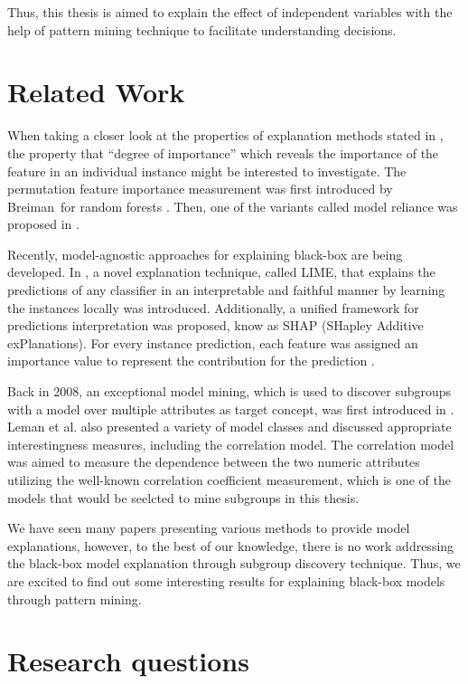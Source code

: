 \documentclass[runningheads]{llncs}
\begin{document}
	Thus, this thesis is aimed to explain the effect of independent variables with the help of pattern mining technique to facilitate understanding decisions.
	
	
	\section{Related Work}
	
	When taking a closer look at the properties of explanation methods stated in \cite{robnik2018perturbation}, the property that “degree of importance” which reveals the importance of the feature in an individual instance might be interested to investigate. The permutation feature importance measurement was first introduced by Breiman for random forests \cite{breiman2001random}. Then, one of the variants called model reliance was proposed in \cite{fisher2018model}. 
	
	Recently, model-agnostic approaches for explaining black-box are being developed. In \cite{ribeiro2016should}, a novel explanation technique, called LIME,  that explains the predictions of any classifier in an interpretable and faithful manner by learning the instances locally was introduced. Additionally, a unified framework for predictions interpretation was proposed, know as SHAP (SHapley Additive exPlanations). For every instance prediction, each feature was assigned an importance value to represent the contribution for the prediction \cite{lundberg2017unified}.
	
	Back in 2008, an exceptional model mining, which is used to discover subgroups with a model over multiple attributes as target concept, was first introduced in \cite{leman2008exceptional}. Leman et al. also presented a variety of model classes and discussed appropriate interestingness measures, including the correlation model. The correlation model was aimed to measure the dependence between the two numeric attributes utilizing the well-known correlation coefficient measurement, which is one of the models that would be seelcted to mine subgroups in this thesis. 
	
	We have seen many papers presenting various methods to provide model explanations, however, to the best of our knowledge, there is no work addressing the black-box model explanation through subgroup discovery technique. Thus, we are excited to find out some interesting results for explaining black-box models through pattern mining. 
	
	\section{Research questions}
	
\end{document}
